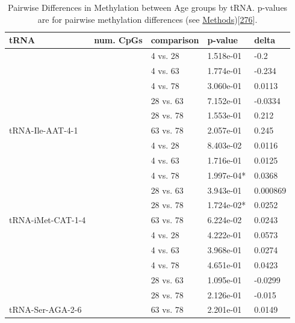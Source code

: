 \documentclass[
]{book}
\begin{document}
\newpage

\begin{table}

\caption{\label{tab:pairwiseTab}Pairwise Differences in Methylation between Age groups by tRNA. p-values are for pairwise methylation differences (see \protect\hyperlink{targetedBiSseq}{Methods}){[}\protect\hyperlink{ref-Muller2019}{276}{]}.}
\centering
\begin{tabular}[t]{lrlll}
\toprule
tRNA & num. CpGs & comparison & p-value & delta\\
\midrule
 &  & 4 vs. 28 & 1.518e-01 & -0.2\\

 &  & 4 vs. 63 & 1.774e-01 & -0.234\\

 &  & 4 vs. 78 & 3.060e-01 & 0.0113\\

 &  & 28 vs. 63 & 7.152e-01 & -0.0334\\

 &  & 28 vs. 78 & 1.553e-01 & 0.212\\

\multirow{-6}{*}{\raggedright\arraybackslash tRNA-Ile-AAT-4-1} & \multirow{-6}{*}{\raggedleft\arraybackslash 8} & 63 vs. 78 & 2.057e-01 & 0.245\\
\cmidrule{1-5}
 &  & 4 vs. 28 & 8.403e-02 & 0.0116\\

 &  & 4 vs. 63 & 1.716e-01 & 0.0125\\

 &  & 4 vs. 78 & 1.997e-04* & 0.0368\\

 &  & 28 vs. 63 & 3.943e-01 & 0.000869\\

 &  & 28 vs. 78 & 1.724e-02* & 0.0252\\

\multirow{-6}{*}{\raggedright\arraybackslash tRNA-iMet-CAT-1-4} & \multirow{-6}{*}{\raggedleft\arraybackslash 5} & 63 vs. 78 & 6.224e-02 & 0.0243\\
\cmidrule{1-5}
 &  & 4 vs. 28 & 4.222e-01 & 0.0573\\

 &  & 4 vs. 63 & 3.968e-01 & 0.0274\\

 &  & 4 vs. 78 & 4.651e-01 & 0.0423\\

 &  & 28 vs. 63 & 1.095e-01 & -0.0299\\

 &  & 28 vs. 78 & 2.126e-01 & -0.015\\

\multirow{-6}{*}{\raggedright\arraybackslash tRNA-Ser-AGA-2-6} & \multirow{-6}{*}{\raggedleft\arraybackslash 9} & 63 vs. 78 & 2.201e-01 & 0.0149\\
\bottomrule
\end{tabular}
\end{table}
\end{document}
